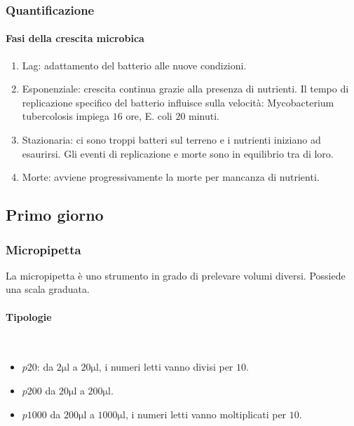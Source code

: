 		\subsubsection{Quantificazione}
	
			\paragraph{Fasi della crescita microbica}\mbox{}
			\begin{enumerate}
				\item Lag: adattamento del batterio alle nuove condizioni.
				\item Esponenziale: crescita continua grazie alla presenza di nutrienti.
					Il tempo di replicazione specifico del batterio influisce sulla velocit\`a: Mycobacterium tubercolosis impiega $16$ ore, E. coli $20$ minuti.
				\item Stazionaria: ci sono troppi batteri sul terreno e i nutrienti iniziano ad esaurirsi.
					Gli eventi di replicazione e morte sono in equilibrio tra di loro.
				\item Morte: avviene progressivamente la morte per mancanza di nutrienti.
			\end{enumerate}
	\subsection{Primo giorno}

		\subsubsection{Micropipetta}
		La micropipetta \`e uno strumento in grado di prelevare volumi diversi.
		Possiede una scala graduata.

			\paragraph{Tipologie}\mbox{}\\
			\begin{multicols}{2}
				\begin{itemize}
					\item $p20$: da $2\si{\micro\litre}$ a $20\si{\micro\litre}$, i numeri letti vanno divisi per $10$.
					\item $p200$ da $20\si{\micro\litre}$ a $200\si{\micro\litre}$.
					\item $p1000$ da $200\si{\micro\litre}$ a $1000\si{\micro\litre}$, i numeri letti vanno moltiplicati per $10$.
				\end{itemize}
			\end{multicols}

